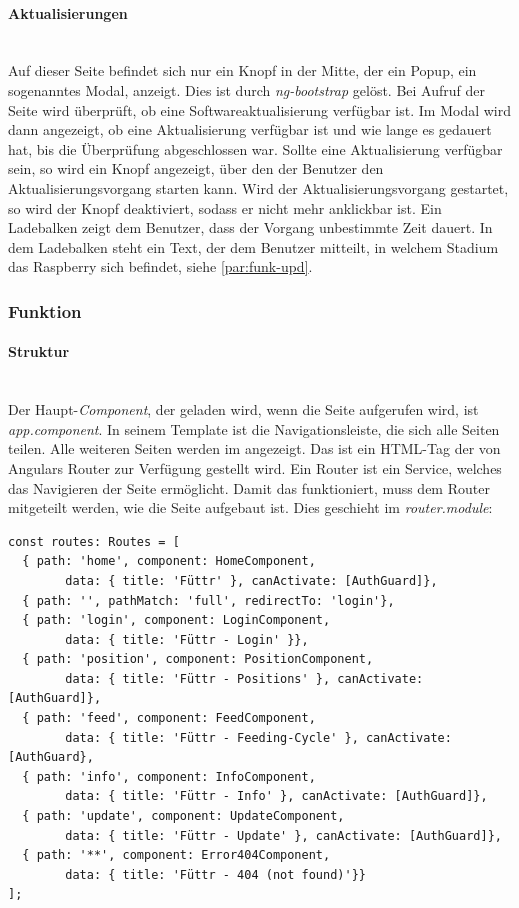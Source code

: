 \paragraph*{Aktualisierungen}\mbox{}\\
Auf dieser Seite befindet sich nur ein Knopf in der Mitte, der ein Popup, ein sogenanntes Modal, anzeigt. Dies ist durch \textit{ng-bootstrap} gelöst. Bei Aufruf der Seite wird überprüft, ob eine Softwareaktualisierung verfügbar ist. Im Modal wird dann angezeigt, ob eine Aktualisierung verfügbar ist und wie lange es gedauert hat, bis die Überprüfung abgeschlossen war. Sollte eine Aktualisierung verfügbar sein, so wird ein Knopf angezeigt, über den der Benutzer den Aktualisierungsvorgang starten kann. Wird der Aktualisierungsvorgang gestartet, so wird der Knopf deaktiviert, sodass er nicht mehr anklickbar ist. Ein Ladebalken zeigt dem Benutzer, dass der Vorgang unbestimmte Zeit dauert. In dem Ladebalken steht ein Text, der dem Benutzer mitteilt, in welchem Stadium das Raspberry sich befindet, siehe \autoref{par:funk-upd}.

\subsubsection{Funktion}
\label{sec:ums-client-funktion}

\paragraph*{Struktur} \mbox {}\\
Der Haupt-\textit{Component}, der geladen wird, wenn die Seite aufgerufen wird, ist \textit{app.component}. In seinem Template ist die Navigationsleiste, die sich alle Seiten teilen. Alle weiteren Seiten werden im  angezeigt. Das ist ein \ac{HTML}-Tag der von Angulars Router zur Verfügung gestellt wird. Ein Router ist ein Service, welches das Navigieren der Seite ermöglicht. Damit das funktioniert, muss dem Router mitgeteilt werden, wie die Seite aufgebaut ist. Dies geschieht im \textit{router.module}:

\begin{lstlisting}[caption=Routes Definition,style=TS]
const routes: Routes = [
  { path: 'home', component: HomeComponent, 
  		data: { title: 'Füttr' }, canActivate: [AuthGuard]},
  { path: '', pathMatch: 'full', redirectTo: 'login'},
  { path: 'login', component: LoginComponent,
  		data: { title: 'Füttr - Login' }},
  { path: 'position', component: PositionComponent, 
  		data: { title: 'Füttr - Positions' }, canActivate: [AuthGuard]},
  { path: 'feed', component: FeedComponent, 
  		data: { title: 'Füttr - Feeding-Cycle' }, canActivate: [AuthGuard},
  { path: 'info', component: InfoComponent, 
  		data: { title: 'Füttr - Info' }, canActivate: [AuthGuard]},
  { path: 'update', component: UpdateComponent, 
  		data: { title: 'Füttr - Update' }, canActivate: [AuthGuard]},
  { path: '**', component: Error404Component, 
  		data: { title: 'Füttr - 404 (not found)'}}
];
\end{lstlisting}

